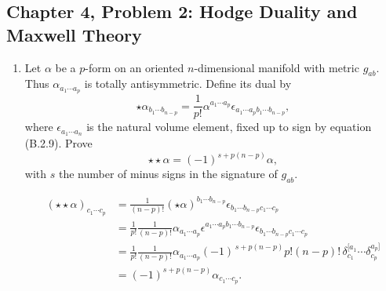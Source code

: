 \subsection{Chapter 4, Problem 2: Hodge Duality and Maxwell Theory}

\begin{enumerate}[label=\alph*)]
    \item Let $\alpha$ be a $p$-form on an oriented $n$-dimensional manifold
    with metric $g_{ab}$. Thus $\alpha_{a_1\cdots a_p}$ is totally
    antisymmetric. Define its dual by
    \begin{equation}
        \star\alpha_{b_1\cdots b_{n-p}}
        =\frac{1}{p!}\alpha^{a_1\cdots a_p}
        \epsilon_{a_1\cdots a_p b_1\cdots b_{n-p}},
    \end{equation}
    where $\epsilon_{a_1\cdots a_n}$ is the natural volume element, fixed up to
    sign by equation (B.2.9). Prove
    \begin{equation}
        {\star\star}\alpha=(-1)^{s+p(n-p)}\alpha,
    \end{equation}
    with $s$ the number of minus signs in the signature of $g_{ab}$.
    \begin{solution}
        \begin{equation}
            \begin{aligned}
                (\star\star \alpha)_{c_1\cdots c_p}  &=\frac{1}{(n-p)!}(\star \alpha)^{b_1\cdots b_{n-p}}\epsilon_{b_1\cdots b_{n-p}c_1\cdots c_p}\\
                &=\frac{1}{p!}\frac{1}{(n-p)!} \alpha_{a_1 \cdots a_p}\epsilon^{a_1\cdots a_p b_1 \cdots b_{n-p}}\epsilon_{b_1\cdots b_{n-p}c_1\cdots c_p}\\
                &=\frac{1}{p!}\frac{1}{(n-p)!}\alpha_{a_1 \cdots a_p}
                (-1)^{\,s+p(n-p)}
                p!(n-p)!\,
                \delta^{[a_1}_{c_1}\cdots\delta^{a_p]}_{c_p}\\
                &=(-1)^{s+p(n-p)}\alpha_{c_1\cdots c_p}.
            \end{aligned}
        \end{equation}
    \end{solution}


\end{enumerate}
